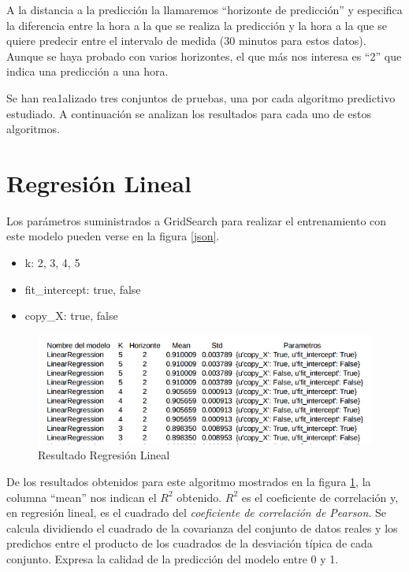 A la distancia a la predicción la llamaremos ``horizonte de predicción'' y especifica la diferencia entre la hora a la que se realiza la predicción y la hora a la que se quiere predecir entre el intervalo de medida (30 minutos para estos datos). Aunque se haya probado con varios horizontes, el que más nos interesa es ``2'' que indica una predicción a una hora.

Se han rea1alizado tres conjuntos de pruebas, una por cada algoritmo predictivo estudiado. A continuación se analizan los resultados para cada uno de estos algoritmos.

\section{Regresión Lineal}
\label{makereference7.1}
Los parámetros suministrados a GridSearch para realizar el entrenamiento con este modelo pueden verse en la figura \ref{json}.

\begin{itemize}
\item k: 2, 3, 4, 5
\item fit\_intercept: true, false
\item copy\_X: true, false 
\end{itemize}

\begin{figure}[htb]
	\begin{center}
		\includegraphics[width=14cm]{figures/resultado_linear.png}
		\caption{Resultado Regresión Lineal \label{resultado_linear}}
	\end{center}
\end{figure}

De los resultados obtenidos para este algoritmo mostrados en la figura \ref{resultado_linear}, la columna ``mean'' nos indican el \(R^{2}\) obtenido. \(R^{2}\) es el coeficiente de correlación y, en regresión lineal, es el cuadrado del \textit{coeficiente de correlación de Pearson}. Se calcula dividiendo el cuadrado de la covarianza del conjunto de datos reales y los predichos entre el producto de los cuadrados de la desviación típica de cada conjunto. Expresa la calidad de la predicción del modelo entre 0 y 1.

